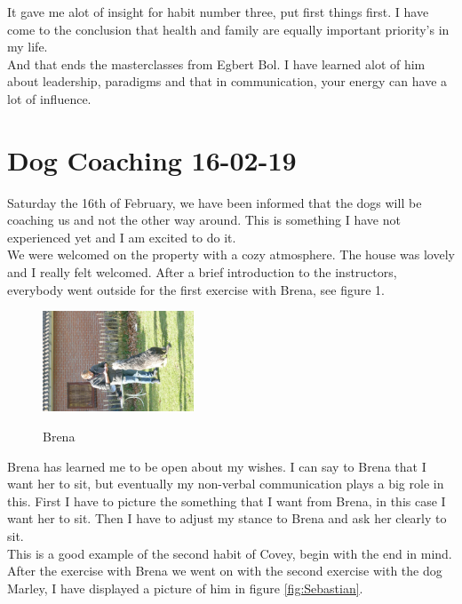 \documentclass{article}
\begin{document}
It gave me alot of insight for habit number three, put first things first. I have come to the conclusion that health and family are equally important priority's in my life.\\

And that ends the masterclasses from Egbert Bol. I have learned alot of him about leadership, paradigms and that in communication, your energy can have a lot of influence.

\section{Dog Coaching 16-02-19}
Saturday the 16th of February, we have been informed that the dogs will be coaching us and not the other way around. This is something I have not experienced yet and I am excited to do it. \\

We were welcomed on the property with a cozy atmosphere. The house was lovely and I really felt welcomed. After a brief introduction to the instructors, everybody went outside for the first exercise with Brena, see figure 1.\\

\begin{figure}[!h]
	\centering
	\includegraphics[width=0.4\textwidth]{brena}
	\label{fig:Brena}
	\caption{Brena}
\end{figure}

Brena has learned me to be open about my wishes. I can say to Brena that I want her to sit, but eventually my non-verbal communication plays a big role in this. First I have to picture the something that I want from Brena, in this case I want her to sit. Then I have to adjust my stance to Brena and ask her clearly to sit.\\

This is a good example of the second habit of Covey, begin with the end in mind.\\


After the exercise with Brena we went on with the second exercise with the dog Marley, I have displayed a picture of him in figure \ref{fig:Sebastian}.  
\end{document}
